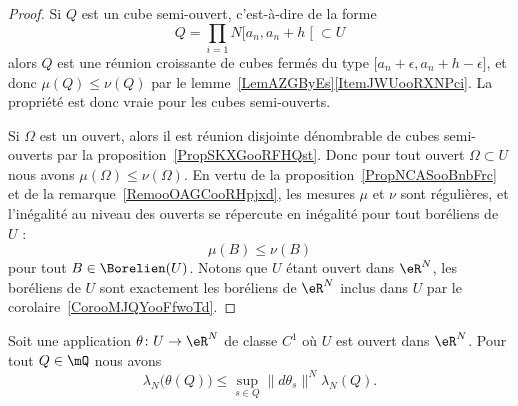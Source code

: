 \begin{proof}
    Si \( Q\) est un cube semi-ouvert, c'est-à-dire de la forme
    \begin{equation}
        Q=\prod_{i=1}N\mathopen[ a_n , a_n+h \mathclose[\subset U
    \end{equation}
    alors \( Q\) est une réunion croissante de cubes fermés du type \( \mathopen[ a_n+\epsilon , a_n+h-\epsilon \mathclose]\), et donc \( \mu(Q)\leq \nu(Q)\) par le lemme~\ref{LemAZGByEs}\ref{ItemJWUooRXNPci}. La propriété est donc vraie pour les cubes semi-ouverts.

    Si \( \Omega\) est un ouvert, alors il est réunion disjointe dénombrable de cubes semi-ouverts par la proposition~\ref{PropSKXGooRFHQst}. Donc pour tout ouvert \( \Omega\subset U\) nous avons \( \mu(\Omega)\leq\nu(\Omega)\). En vertu de la proposition~\ref{PropNCASooBnbFrc} et de la remarque~\ref{RemooOAGCooRHpjxd}, les mesures \( \mu\) et \( \nu\) sont régulières, et l'inégalité au niveau des ouverts se répercute en inégalité pour tout boréliens de \( U\) :
    \begin{equation}
        \mu(B)\leq \nu(B)
    \end{equation}
    pour tout \( B\in\Borelien(U)\). Notons que \( U\) étant ouvert dans \( \eR^N\), les boréliens de \( U\) sont exactement les boréliens de \( \eR^N\) inclus dans \( U\) par le corolaire~\ref{CorooMJQYooFfwoTd}.
\end{proof}

\begin{lemma}      \label{LemooJCEDooBRyjRg}
    Soit une application \( \theta\colon U\to \eR^N\) de classe \( C^1\) où \( U\) est ouvert dans \( \eR^N\). Pour tout \( Q\in\mQ\) nous avons
    \begin{equation}
        \lambda_N\big( \theta(Q) \big)\leq\sup_{s\in Q}\| d\theta_s \|^N\lambda_N(Q).
    \end{equation}
\end{lemma}

